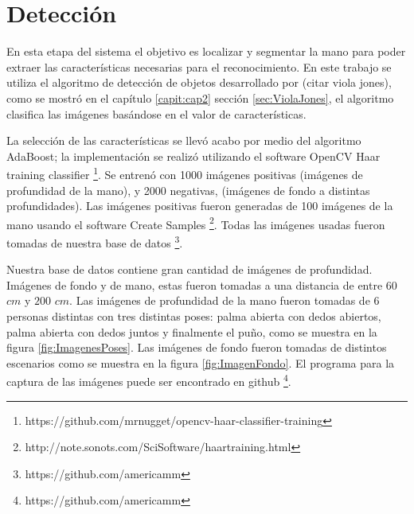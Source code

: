 
\section{Detección}\label{sec:DeteccionSystem} 

En esta etapa del sistema el objetivo es localizar y segmentar la mano para poder extraer las características necesarias para el reconocimiento. 
En este trabajo se utiliza el algoritmo de detección de objetos desarrollado por (citar viola jones), como se mostró en el cap\'itulo \ref{capit:cap2} sección \ref{sec:ViolaJones}, el algoritmo  clasifica las imágenes basándose en el valor de características. 


La selección de las características se llev\'o acabo por medio del algoritmo AdaBoost; la implementaci\'on se realiz\'o utilizando el software OpenCV Haar training classifier \footnote{https://github.com/mrnugget/opencv-haar-classifier-training}. Se entren\'o con 1000 imágenes positivas (imágenes de profundidad de la mano), y 2000 negativas, (imágenes de fondo a distintas profundidades). Las imágenes positivas fueron generadas de 100 imágenes de la mano usando el software Create Samples \footnote{http://note.sonots.com/SciSoftware/haartraining.html}. Todas las imágenes usadas fueron tomadas de nuestra base de  datos \footnote{https://github.com/americamm}.

Nuestra base de datos contiene gran cantidad de imágenes de profundidad. Imágenes de fondo y de mano, estas fueron tomadas a una distancia de entre $60$ $cm$ y $200$ $cm$. Las imágenes de profundidad de la mano fueron tomadas de 6 personas distintas con tres distintas poses: palma abierta con dedos abiertos, palma abierta con dedos juntos y finalmente el pu\~no, como se muestra en la figura \ref{fig:ImagenesPoses}. Las imágenes de fondo fueron tomadas de distintos escenarios como se muestra en la figura \ref{fig:ImagenFondo}. El programa para la captura de las imágenes puede ser encontrado en github \footnote{https://github.com/americamm}.  

